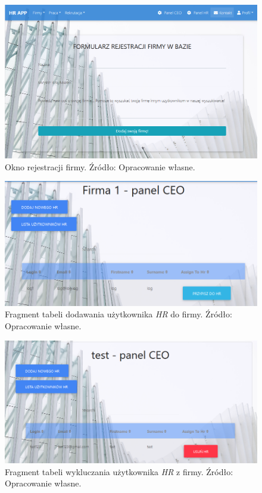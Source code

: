 \documentclass[twoside]{projektInzynierskiMS}
\numberwithin{figure}{section}
\begin{document}
\begin{figure}[h!]
    \centering
    \includegraphics[width = \textwidth]{images/rejestracjaFirmy.png}
    \caption{Okno rejestracji firmy. Źródło: Opracowanie własne.}
    \label{fig:okno_rejestracji_firmy}
\end{figure}

\begin{figure}[h!]
    \centering
    \includegraphics[width = \textwidth]{images/dodawanieHr.png}
    \caption{Fragment tabeli dodawania użytkownika \textit{HR} do firmy. Źródło: Opracowanie własne.}
    \label{fig:panel_dodawania_hr}
\end{figure}

\newpage

\begin{figure}[h!]
    \centering
    \includegraphics[width = \textwidth]{images/kasowanieHr.png}
    \caption{Fragment tabeli wykluczania użytkownika \textit{HR} z firmy. Źródło: Opracowanie własne.}
    \label{fig:panel_kasowania_hr}
\end{figure}
\end{document}
